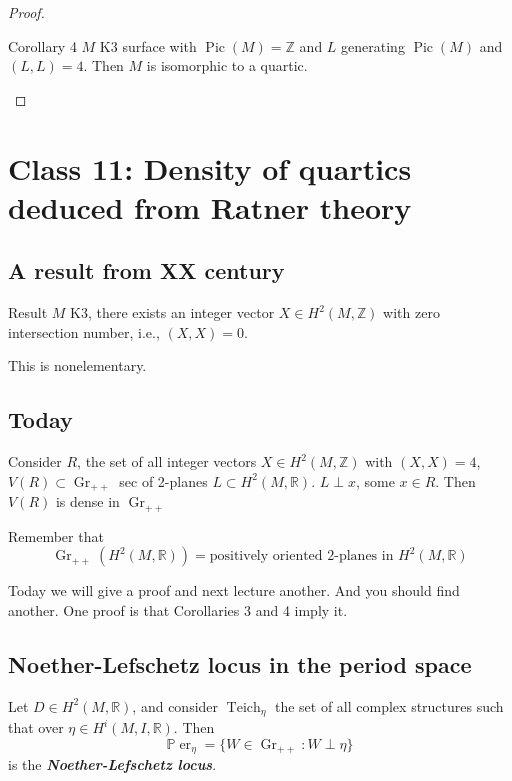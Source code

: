 \begin{proof}
\begin{thing6}{Corollary 4}\leavevmode
	$M$ K3 surface with $\operatorname{Pic}(M) =\mathbb{Z}$ and $L$ generating  $\operatorname{Pic}(M)$ and $(L,L)=4$. Then  $M$ is isomorphic to a quartic.
\end{thing6}
\end{proof}

\section{Class 11: Density of quartics deduced from Ratner theory}

\subsection{A result from XX century}

\begin{thing1}{Result}\leavevmode
	$M$ K3, there exists an integer vector $X\in H^{2}(M,\mathbb{Z})$ with zero intersection number, i.e., $(X,X)=0$.
\end{thing1}

This is nonelementary.

\subsection{Today}
Consider $R$, the set of all integer vectors  $X\in H^{2}(M,\mathbb{Z})$ with $(X,X)=4$,  $V(R)\subset \operatorname{Gr}_{++}$ sec of 2-planes $L \subset H^{2}(M,\mathbb{R})$. $L\perp x$, some $x\in R$. Then $V(R)$ is dense in $\operatorname{Gr}_{+ +}$

Remember that
\[\operatorname{Gr}_{++}(H^{2}(M,\mathbb{R}))=\text{positively oriented 2-planes in }H^{2}(M,\mathbb{R}) \]

Today we will give a proof and next lecture another. And you should find another. One proof is that Corollaries 3 and 4 imply it.

\subsection{Noether-Lefschetz locus in the period space}

\begin{defn}\leavevmode
	Let $D\in H^{2}(M,\mathbb{R})$, and consider $\operatorname{Teich}_\eta$ the set of all complex structures such that over $\eta\in H^i(M,I,\mathbb{R})$. Then
	 \[\mathbb{P}\operatorname{er}_\eta=\{W\in\operatorname{Gr}_{++}:W\perp \eta\}\]
	 is the \textit{\textbf{Noether-Lefschetz locus}}.
\end{defn}


